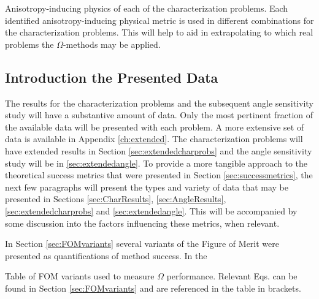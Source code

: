\begin{table}[h!]
  \centering
  
  \caption[Anisotropy-inducing physics of each of the characterization problems.]
  {Anisotropy-inducing physics of each of the characterization problems.
  Each identified anisotropy-inducing physical metric is used in different
  combinations for the characterization problems. This will help to aid in
  extrapolating to which real problems the $\Omega$-methods may be applied.}
  \label{tab:probphysics}
\end{table}

\subsection{Introduction the Presented Data}
\label{subsec:resultsintro}

The results for the characterization problems and the subsequent angle
sensitivity study will have a substantive amount of data. Only the most
pertinent fraction of the available data will be presented with each problem.
A more extensive set of data is available in Appendix \ref{ch:extended}. The
characterization problems will have extended results in Section
\ref{sec:extendedcharprobs} and the angle sensitivity study will be in
\ref{sec:extendedangle}. To provide a more tangible approach to the theoretical success
metrics that were presented in Section \ref{sec:successmetrics}, the next few
paragraphs will present the types and variety of data that may be presented in
Sections \ref{sec:CharResults}, \ref{sec:AngleResults},
\ref{sec:extendedcharprobs} and \ref{sec:extendedangle}. This will be
accompanied by some discussion into the factors influencing these metrics, when
relevant.

In Section \ref{sec:FOMvariants} several variants of the Figure of Merit were
presented as quantifications of method success. In the

\begin{table}[h!]
  \centering
  
  \caption[Table of FOM variants used to measure $\Omega$ performance.]{
  Table of FOM variants used to measure $\Omega$ performance. Relevant Eqs. can
  be found in Section \ref{sec:FOMvariants} and are referenced in the table in
  brackets.}
  \label{tab:fom_defaults}
\end{table}


